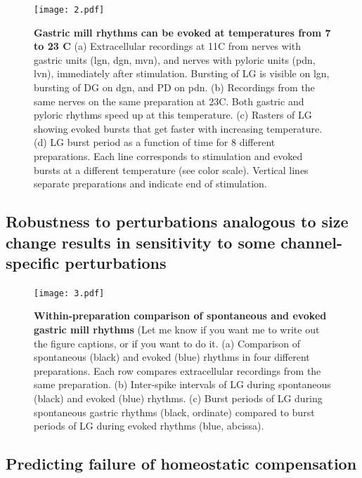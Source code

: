 \documentclass[9pt,lineno]{elife}
\begin{document}
\begin{figure}
\begin{fullwidth}
\texttt{[image: 2.pdf]}

\caption{\textbf{Gastric mill rhythms can be evoked at temperatures from 7 to 23 C }  (a) Extracellular recordings at 11\degree C from nerves with gastric units (lgn, dgn, mvn), and nerves with pyloric units (pdn, lvn), immediately after stimulation. Bursting of LG is visible on lgn, bursting of DG on dgn, and PD on pdn. (b) Recordings from the same nerves on the same preparation at 23\degree C. Both gastric and pyloric rhythms speed up at this temperature. (c) Rasters of LG showing evoked bursts that get faster with increasing temperature. (d) LG burst period as a function of time for 8 different preparations. Each line corresponds to stimulation and evoked bursts at a different temperature (see color scale). Vertical lines separate preparations and indicate end of stimulation. } 
\label{fig:2}
\end{fullwidth}
\end{figure}




\subsection{Robustness to perturbations analogous to size change results in sensitivity to some channel-specific perturbations}


\begin{figure}
\begin{fullwidth}
\texttt{[image: 3.pdf]}

\caption{\textbf{Within-preparation comparison of spontaneous and evoked gastric mill rhythms} (Let me know if you want me to write out the figure captions, or if you want to do it. (a) Comparison of spontaneous (black) and evoked (blue) rhythms in four different preparations. Each row compares extracellular recordings from the same preparation. (b) Inter-spike intervals of LG during spontaneous (black) and evoked (blue) rhythms. (c) Burst periods of LG during spontaneous gastric rhythms (black, ordinate) compared to burst periods of LG during evoked rhythms (blue, abcissa).  }
\label{fig:2}
\end{fullwidth}
\end{figure}


\lipsum[1-4]

\subsection{Predicting failure of homeostatic compensation}
\end{document}
